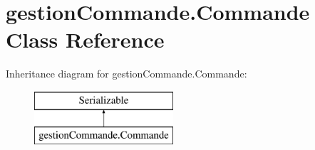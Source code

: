 \hypertarget{classgestion_commande_1_1_commande}{\section{gestion\-Commande.\-Commande Class Reference}
\label{classgestion_commande_1_1_commande}
}
Inheritance diagram for gestion\-Commande.\-Commande\-:\begin{figure}[H]
\begin{center}
\leavevmode
\includegraphics[height=2.000000cm]{classgestion_commande_1_1_commande}
\end{center}
\end{figure}
